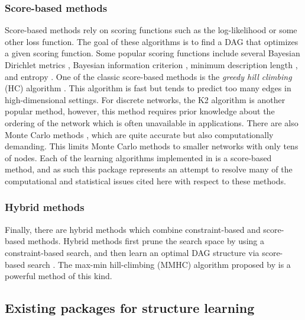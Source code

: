 \documentclass[article]{jss}
\renewcommand{\|}{\,|\,}
\begin{document}
\subsubsection{Score-based methods}
Score-based methods rely on scoring functions such as the log-likelihood or some other loss function. The goal of these algorithms is to find a DAG that optimizes a given scoring function.
Some popular scoring functions include
several Bayesian Dirichlet metrics \citep{Buntine91, Cooper92,
  Heckerman95}, Bayesian information criterion \citep{Chickering97},
minimum description length \citep{Bouckaert93prob, Suzuki93, Lam94}, and entropy \citep{Herskovits90}. One of the classic score-based methods is the \emph{greedy hill climbing} (HC) algorithm  \citep{russell1995artificial}. This algorithm is fast but tends to predict too many edges in high-dimensional settings. For discrete networks, the K2 algorithm \citep{Cooper92} is another popular method, however, this method requires prior knowledge about the ordering of the network which is often unavailable in applications. There are also Monte Carlo methods \citep{Ellis08, Zhou11,niinimaki2016}, which are quite accurate but also computationally demanding. This limits Monte Carlo methods to smaller networks with only tens of nodes. Each of the learning algorithms implemented in  is a score-based method, and as such this package represents an attempt to resolve many of the computational and statistical issues cited here with respect to these methods.

\subsubsection{Hybrid methods}
Finally, there are hybrid methods which combine constraint-based and score-based methods. Hybrid methods first prune the search space by using a constraint-based search, and then learn an optimal DAG structure via score-based search \citep{tsamardinos2006max,perrier2008,gamez2011learning}. The max-min hill-climbing (MMHC) algorithm proposed by \cite{tsamardinos2006max} is a powerful method of this kind.

\subsection[Existing packages]{Existing  packages for structure learning}
\label{subsec:packages}
\end{document}
